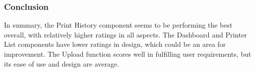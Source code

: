 \subsubsection{Conclusion}
In summary, the Print History component seems to be performing the best overall, with relatively higher ratings in all aspects. The Dashboard and Printer List components have lower ratings in design, which could be an area for improvement. The Upload function scores well in fulfilling user requirements, but its ease of use and design are average.

